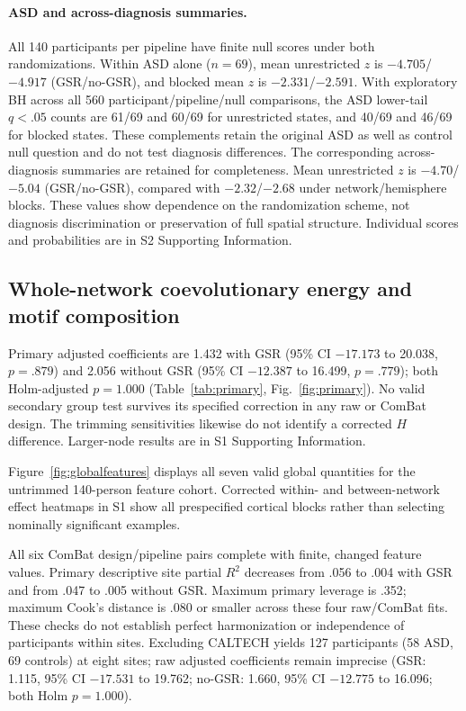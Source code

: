 \documentclass[10pt,letterpaper]{article}
\begin{document}
\paragraph*{ASD and across-diagnosis summaries.}
All 140 participants per pipeline have finite null scores under both randomizations.
Within ASD alone ($n=69$), mean unrestricted $z$ is $-4.705$/$-4.917$
(GSR/no-GSR), and blocked mean $z$ is $-2.331$/$-2.591$. With exploratory
BH across all 560 participant/pipeline/null comparisons, the ASD lower-tail
$q<.05$ counts are 61/69 and 60/69 for unrestricted states, and 40/69 and
46/69 for blocked states. These complements retain the original ASD as well
as control null question and do not test diagnosis differences.
The corresponding across-diagnosis summaries are retained for completeness.
Mean unrestricted $z$ is $-4.70$/$-5.04$ (GSR/no-GSR), compared with
$-2.32$/$-2.68$ under network/hemisphere blocks. These values show dependence on
the randomization scheme, not diagnosis discrimination or preservation of full
spatial structure. Individual scores and probabilities are in S2 Supporting Information.



\subsection*{Whole-network coevolutionary energy and motif composition}
Primary adjusted coefficients are 1.432 with GSR (95\% CI $-17.173$ to 20.038,
$p=.879$) and 2.056 without GSR (95\% CI $-12.387$ to 16.499, $p=.779$);
both Holm-adjusted $p=1.000$ (Table~\ref{tab:primary}, Fig.~\ref{fig:primary}).
No valid secondary group test survives its specified correction in any raw or
ComBat design. The trimming sensitivities likewise do not identify a corrected
$H$ difference. Larger-node results are in S1 Supporting Information.



Figure~\ref{fig:globalfeatures} displays all seven valid global quantities for
the untrimmed 140-person feature cohort. Corrected within- and between-network
effect heatmaps in S1 show all prespecified cortical blocks rather than selecting
nominally significant examples.

All six ComBat design/pipeline pairs complete with finite, changed feature values.
Primary descriptive site partial $R^2$ decreases from .056 to .004 with GSR and
from .047 to .005 without GSR. Maximum primary leverage is .352; maximum Cook's
distance is .080 or smaller across these four raw/ComBat fits. These checks do
not establish perfect harmonization or independence of participants within sites.
Excluding CALTECH yields 127 participants (58 ASD, 69 controls) at eight sites;
raw adjusted coefficients remain imprecise (GSR: 1.115, 95\% CI $-17.531$ to
19.762; no-GSR: 1.660, 95\% CI $-12.775$ to 16.096; both Holm $p=1.000$).
\end{document}
